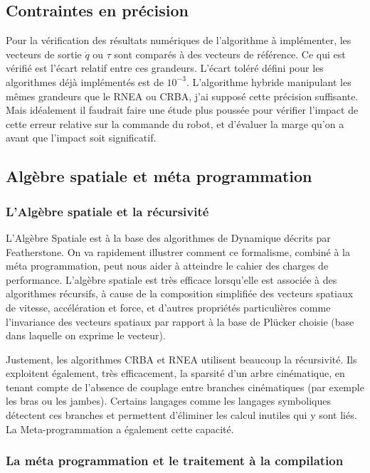 \documentclass{report}
\begin{document}
\subsection{Contraintes en précision}

Pour la vérification des résultats numériques de l'algorithme à implémenter, les vecteurs de sortie $\ddot{q}$ ou $\tau$ sont comparés à des vecteurs de référence. Ce qui est vérifié est l'écart relatif entre ces grandeurs. L'écart toléré défini pour les algorithmes déjà implémentés est de $10^{-3}$. L'algorithme hybride manipulant les mêmes grandeurs que le RNEA ou CRBA, j'ai supposé cette précision suffisante. Mais idéalement il faudrait faire une étude plus poussée pour vérifier l'impact de cette erreur relative sur la commande du robot, et d'évaluer la marge qu'on a avant que l'impact soit significatif.


\subsection{Algèbre spatiale et méta programmation}

\subsubsection*{L'Algèbre spatiale et la récursivité}

L'Algèbre Spatiale est à la base des algorithmes de Dynamique décrits par Featherstone. On va rapidement illustrer comment ce formalisme, combiné à la méta programmation, peut nous aider à atteindre le cahier des charges de performance. L'algèbre spatiale est très efficace lorsqu'elle est associée à des algorithmes récursifs, à cause de la composition simplifiée des vecteurs spatiaux de vitesse, accélération et force, et d'autres propriétés particulières comme l'invariance des vecteurs spatiaux par rapport à la base de Plücker choisie (base dans laquelle on exprime le vecteur).

Justement, les algorithmes CRBA et RNEA utilisent beaucoup la récursivité. Ils exploitent également, très efficacement, la sparsité d'un arbre cinématique, en tenant compte de l'absence de couplage entre branches cinématiques (par exemple les bras ou les jambes). Certains langages comme les langages symboliques détectent ces branches et permettent d'éliminer les calcul inutiles qui y sont liés. La Meta-programmation a également cette capacité.

\subsubsection*{La méta programmation et le traitement à la compilation}
\end{document}
